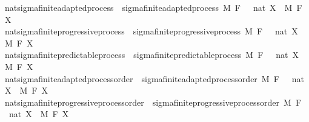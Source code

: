\begin{isabellebody}
\isanewline
\isanewline
\isanewline
{}\isamarkupfalse%
\ nat{\isacharunderscore}{\kern0pt}sigma{\isacharunderscore}{\kern0pt}finite{\isacharunderscore}{\kern0pt}adapted{\isacharunderscore}{\kern0pt}process\ {\isacharequal}{\kern0pt}\ sigma{\isacharunderscore}{\kern0pt}finite{\isacharunderscore}{\kern0pt}adapted{\isacharunderscore}{\kern0pt}process\ M\ F\ {\isachardoublequoteopen}{}\ {\isacharcolon}{\kern0pt}{\isacharcolon}{\kern0pt}\ nat{\isachardoublequoteclose}\ X\ \ M\ F\ X\isanewline
{}\isamarkupfalse%
\ nat{\isacharunderscore}{\kern0pt}sigma{\isacharunderscore}{\kern0pt}finite{\isacharunderscore}{\kern0pt}progressive{\isacharunderscore}{\kern0pt}process\ {\isacharequal}{\kern0pt}\ sigma{\isacharunderscore}{\kern0pt}finite{\isacharunderscore}{\kern0pt}progressive{\isacharunderscore}{\kern0pt}process\ M\ F\ {\isachardoublequoteopen}{}\ {\isacharcolon}{\kern0pt}{\isacharcolon}{\kern0pt}\ nat{\isachardoublequoteclose}\ X\ \ M\ F\ X\isanewline
{}\isamarkupfalse%
\ nat{\isacharunderscore}{\kern0pt}sigma{\isacharunderscore}{\kern0pt}finite{\isacharunderscore}{\kern0pt}predictable{\isacharunderscore}{\kern0pt}process\ {\isacharequal}{\kern0pt}\ sigma{\isacharunderscore}{\kern0pt}finite{\isacharunderscore}{\kern0pt}predictable{\isacharunderscore}{\kern0pt}process\ M\ F\ {\isachardoublequoteopen}{}\ {\isacharcolon}{\kern0pt}{\isacharcolon}{\kern0pt}\ nat{\isachardoublequoteclose}\ X\ \ M\ F\ X\isanewline
\isanewline
{}\isamarkupfalse%
\ nat{\isacharunderscore}{\kern0pt}sigma{\isacharunderscore}{\kern0pt}finite{\isacharunderscore}{\kern0pt}adapted{\isacharunderscore}{\kern0pt}process{\isacharunderscore}{\kern0pt}order\ {\isacharequal}{\kern0pt}\ sigma{\isacharunderscore}{\kern0pt}finite{\isacharunderscore}{\kern0pt}adapted{\isacharunderscore}{\kern0pt}process{\isacharunderscore}{\kern0pt}order\ M\ F\ {\isachardoublequoteopen}{}\ {\isacharcolon}{\kern0pt}{\isacharcolon}{\kern0pt}\ nat{\isachardoublequoteclose}\ X\ \ M\ F\ X\isanewline
{}\isamarkupfalse%
\ nat{\isacharunderscore}{\kern0pt}sigma{\isacharunderscore}{\kern0pt}finite{\isacharunderscore}{\kern0pt}progressive{\isacharunderscore}{\kern0pt}process{\isacharunderscore}{\kern0pt}order\ {\isacharequal}{\kern0pt}\ sigma{\isacharunderscore}{\kern0pt}finite{\isacharunderscore}{\kern0pt}progressive{\isacharunderscore}{\kern0pt}process{\isacharunderscore}{\kern0pt}order\ M\ F\ {\isachardoublequoteopen}{}\ {\isacharcolon}{\kern0pt}{\isacharcolon}{\kern0pt}\ nat{\isachardoublequoteclose}\ X\ \ M\ F\ X\isanewline

\end{isabellebody}
